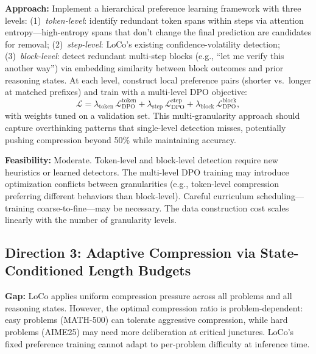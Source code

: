 \documentclass[11pt,a4paper]{article}
\begin{document}
\textbf{Approach:} Implement a hierarchical preference learning framework with three levels: (1)~\emph{token-level}: identify redundant token spans within steps via attention entropy---high-entropy spans that don't change the final prediction are candidates for removal; (2)~\emph{step-level}: LoCo's existing confidence-volatility detection; (3)~\emph{block-level}: detect redundant multi-step blocks (e.g., ``let me verify this another way'') via embedding similarity between block outcomes and prior reasoning states. At each level, construct local preference pairs (shorter vs.\ longer at matched prefixes) and train with a multi-level DPO objective:
\begin{equation}
  \mathcal{L} = \lambda_{\mathrm{token}}\,\mathcal{L}_{\mathrm{DPO}}^{\mathrm{token}} + \lambda_{\mathrm{step}}\,\mathcal{L}_{\mathrm{DPO}}^{\mathrm{step}} + \lambda_{\mathrm{block}}\,\mathcal{L}_{\mathrm{DPO}}^{\mathrm{block}},
\end{equation}
with weights tuned on a validation set. This multi-granularity approach should capture overthinking patterns that single-level detection misses, potentially pushing compression beyond 50\% while maintaining accuracy.

\textbf{Feasibility:} Moderate. Token-level and block-level detection require new heuristics or learned detectors. The multi-level DPO training may introduce optimization conflicts between granularities (e.g., token-level compression preferring different behaviors than block-level). Careful curriculum scheduling---training coarse-to-fine---may be necessary. The data construction cost scales linearly with the number of granularity levels.

\subsection{Direction 3: Adaptive Compression via State-Conditioned Length Budgets}
\textbf{Gap:} LoCo applies uniform compression pressure across all problems and all reasoning states. However, the optimal compression ratio is problem-dependent: easy problems (MATH-500) can tolerate aggressive compression, while hard problems (AIME25) may need more deliberation at critical junctures. LoCo's fixed preference training cannot adapt to per-problem difficulty at inference time.
\end{document}
